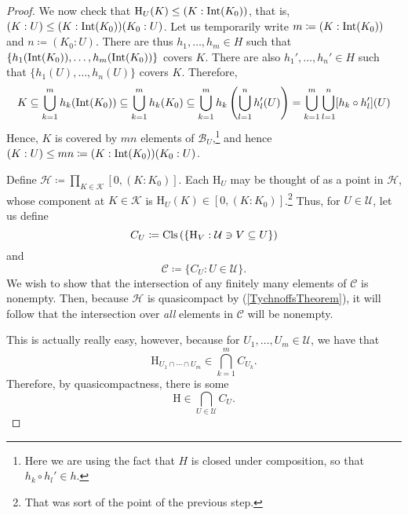 \begin{thm}
\begin{savenotes}
\begin{proof}
We now check that $\mathrm{H}_U(K)\leq (K:\operatorname{Int} (K_0))$, that is, $(K:U)\leq (K:\operatorname{Int} (K_0))(K_0:U)$.  Let us temporarily write $m\coloneqq (K:\operatorname{Int} (K_0))$ and $n\coloneqq (K_0:U)$.  There are thus $h_1,\ldots ,h_m\in H$ such that $\{ h_1(\operatorname{Int} (K_0)),\ldots ,h_m(\operatorname{Int} (K_0))\}$ covers $K$.  There are also $h_1',\ldots ,h_n'\in H$ such that $\{ h_1(U),\ldots ,h_n(U)\}$ covers $K$.  Therefore,
\begin{equation}
K\subseteq \bigcup _{k=1}^mh_k(\operatorname{Int} (K_0))\subseteq \bigcup _{k=1}^mh_k(K_0)\subseteq \bigcup _{k=1}^mh_k\left( \bigcup _{l=1}^nh_l'(U)\right) =\bigcup _{k=1}^m\bigcup _{l=1}^n[h_k\circ h_l'](U)
\end{equation}
Hence, $K$ is covered by $mn$ elements of $\mathcal{B}_U$,\footnote{Here we are using the fact that $H$ is closed under composition, so that $h_k\circ h_l'\in h$.} and hence $(K:U)\leq mn\coloneqq (K:\operatorname{Int} (K_0))(K_0:U)$.

Define $\mathcal{H}\coloneqq \prod _{K\in \mathcal{K}}[0,(K:K_0)]$.  Each $\mathrm{H}_U$ may be thought of as a point in $\mathcal{H}$, whose component at $K\in \mathcal{K}$ is $\mathrm{H}_U(K)\in [0,(K:K_0)]$.\footnote{That was sort of the point of the previous step.}  Thus, for $U\in \mathcal{U}$, let us define
\begin{equation}
C_U\coloneqq \operatorname{Cls} \left( \left\{ \mathrm{H}_V:\mathcal{U}\ni V\subseteq U\right\} \right) 
\end{equation}
and
\begin{equation}
\mathcal{C}\coloneqq \{ C_U:U\in \mathcal{U}\} .
\end{equation}
We wish to show that the intersection of any finitely many elements of $\mathcal{C}$ is nonempty.  Then, because $\mathcal{H}$ is quasicompact by  (\cref{TychnoffsTheorem}), it will follow that the intersection over \emph{all} elements in $\mathcal{C}$ will be nonempty.

This is actually really easy, however, because for $U_1,\ldots ,U_m\in \mathcal{U}$, we have that
\begin{equation}
\mathrm{H}_{U_1\cap \cdots \cap U_m}\in \bigcap _{k=1}^mC_{U_k}.
\end{equation}
Therefore, by quasicompactness, there is some
\begin{equation}
\mathrm{H}\in \bigcap _{U\in \mathcal{U}}C_U.
\end{equation}


\end{proof}
\end{savenotes}
\end{thm}
